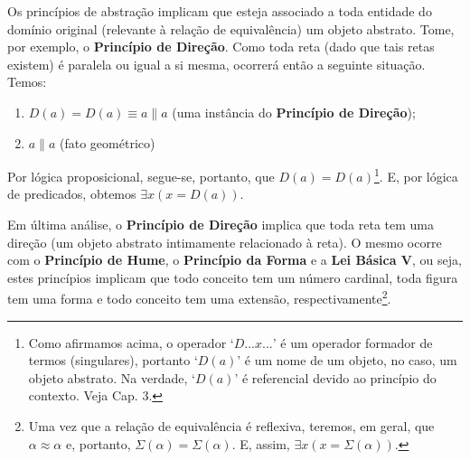 Os princípios de abstração implicam que esteja associado a toda entidade
do domínio original (relevante à relação de equivalência) um objeto
abstrato. Tome, por exemplo, o \textbf{Princípio de Direção}. Como
toda reta (dado que tais retas existem) é paralela ou igual a si mesma,
ocorrerá então a seguinte situação. Temos: 
\begin{enumerate}
\item $D(a)=D(a)\equiv a\parallel a$ (uma instância do \textbf{Princípio
de Direção});
\item $a\parallel a$ (fato geométrico)
\end{enumerate}
Por lógica proposicional, segue-se, portanto, que $D(a)=D(a)$\footnote{Como 
afirmamos acima, o operador `$D...x...$' é um operador formador
de termos (singulares), portanto `$D(a)$' é um nome de um objeto,
no caso, um objeto abstrato. Na verdade, `$D(a)$' é referencial devido
ao princípio do contexto. Veja Cap. 3.}. E, por lógica de predicados, obtemos 
$\exists x(x=D(a))$.

Em última análise, o \textbf{Princípio de Direção} implica que toda
reta tem uma direção (um objeto abstrato intimamente relacionado à
reta). O mesmo ocorre com o \textbf{Princípio de Hume}, o \textbf{Princípio
da Forma} e a \textbf{Lei Básica V}, ou seja, estes princípios implicam
que todo conceito tem um número cardinal, toda figura tem uma forma
e todo conceito tem uma extensão, respectivamente\footnote{Uma vez que a relação
de equivalência é reflexiva, teremos, em geral,
que $\alpha\approx\alpha$ e, portanto, $\Sigma(\alpha)=\Sigma(\alpha)$.
E, assim, $\exists x(x=\Sigma(\alpha))$.}.
